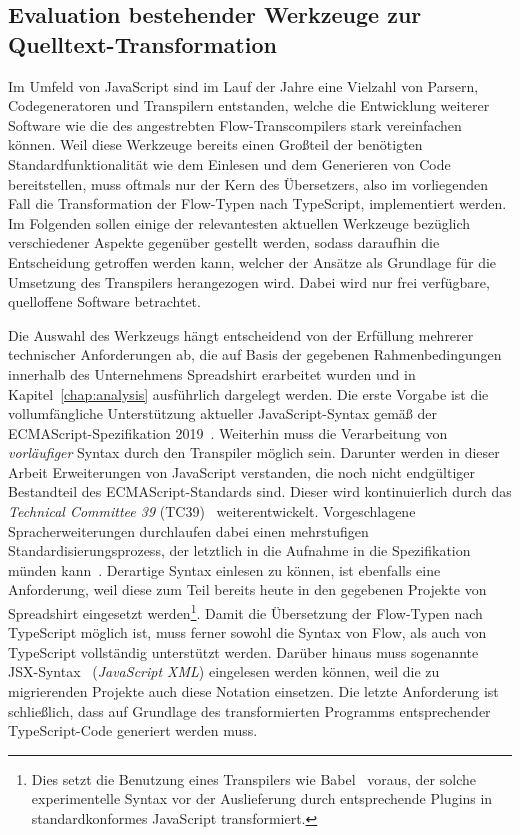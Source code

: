 \subsection{Evaluation bestehender Werkzeuge zur Quelltext-Transformation}
\label{sec:js-transpilers}

Im Umfeld von JavaScript sind im Lauf der Jahre eine Vielzahl von Parsern, Codegeneratoren und Transpilern entstanden, welche die Entwicklung weiterer Software wie die des angestrebten Flow-Transcompilers stark vereinfachen können. Weil diese Werkzeuge bereits einen Großteil der benötigten Standardfunktionalität wie dem Einlesen und dem Generieren von Code bereitstellen, muss oftmals nur der Kern des Übersetzers, also im vorliegenden Fall die Transformation der Flow-Typen nach TypeScript, implementiert werden. Im Folgenden sollen einige der relevantesten aktuellen Werkzeuge bezüglich verschiedener Aspekte gegenüber gestellt werden, sodass daraufhin die Entscheidung getroffen werden kann, welcher der Ansätze als Grundlage für die Umsetzung des Transpilers herangezogen wird. Dabei wird nur frei verfügbare, quelloffene Software betrachtet.

Die Auswahl des Werkzeugs hängt entscheidend von der Erfüllung mehrerer technischer Anforderungen ab, die auf Basis der gegebenen Rahmenbedingungen innerhalb des Unternehmens Spreadshirt erarbeitet wurden und in Kapitel~\ref{chap:analysis} ausführlich dargelegt werden. Die erste Vorgabe ist die vollumfängliche Unterstützung aktueller JavaScript-Syntax gemäß der ECMAScript-Spezifikation 2019~\autocite{ECMASCRIPT:2019}. Weiterhin muss die Verarbeitung von \emph{vorläufiger} Syntax durch den Transpiler möglich sein. Darunter werden in dieser Arbeit Erweiterungen von JavaScript verstanden, die noch nicht endgültiger Bestandteil des ECMAScript-Standards sind. Dieser wird kontinuierlich durch das \textit{Technical Committee 39} (TC39)~\autocite{TC39_COMMITTEE} weiterentwickelt. Vorgeschlagene Spracherweiterungen durchlaufen dabei einen mehrstufigen Standardisierungsprozess, der letztlich in die Aufnahme in die Spezifikation münden kann~\autocite{TC39_PROCESS}. Derartige Syntax einlesen zu können, ist ebenfalls eine Anforderung, weil diese zum Teil bereits heute in den gegebenen Projekte von Spreadshirt eingesetzt werden\footnote{Dies setzt die Benutzung eines Transpilers wie Babel~\autocite{BABEL} voraus, der solche experimentelle Syntax vor der Auslieferung durch entsprechende Plugins in standardkonformes JavaScript transformiert.}. Damit die Übersetzung der Flow-Typen nach TypeScript möglich ist, muss ferner sowohl die Syntax von Flow, als auch von TypeScript vollständig unterstützt werden. Darüber hinaus muss sogenannte JSX-Syntax~\autocite{SOFTWARE:JSX} (\textit{JavaScript XML}) eingelesen werden können, weil die zu migrierenden Projekte auch diese Notation einsetzen. Die letzte Anforderung ist schließlich, dass auf Grundlage des transformierten Programms entsprechender TypeScript-Code generiert werden muss.

